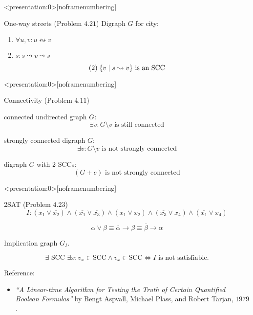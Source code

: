 \begin{frame}<presentation:0>[noframenumbering]
  \begin{exampleblock}{One-way streets (Problem $4.21$)}
	Digraph $G$ for city:
    \begin{enumerate}
      \item $\forall u,v: u \leftrightsquigarrow v$
      \item $s: s \leadsto v \leadsto s$
    \end{enumerate}
  \end{exampleblock}

  \pause
  \[
	(2)\; \{v \mid s \leadsto v\} \text{ is an SCC}
  \]
\end{frame}
\begin{frame}<presentation:0>[noframenumbering]
  \begin{exampleblock}{Connectivity (Problem $4.11$)}
	\begin{description}[Example:]
	  \item[Prove:] connected undirected graph $G$: 
		\[
		  \exists v: G \setminus v \text{ is still connected}
		\]
	  \item[Example:] strongly connected digraph $G$:
		\[
		  \exists v: G \setminus v \text{ is not strongly connected}
		\]
	  \item[Example:] digraph $G$ with 2 SCCs:
		\[
		  (G + e) \text{ is not strongly connected}
		\]
	\end{description}
  \end{exampleblock}
\end{frame}
\begin{frame}<presentation:0>[noframenumbering]
  \begin{exampleblock}{2SAT (Problem $4.23$)}
    \[
      I: (x_1 \lor \overline{x_2}) \land (\overline{x_1} \lor \overline{x_3}) \land (x_1 \lor x_2) \land (\overline{x_3} \lor x_4) \land (\overline{x_1} \lor x_4)
    \]
  \end{exampleblock}

  \pause
  \[
    \alpha \lor \beta \equiv \overline{\alpha} \to \beta \equiv \overline{\beta} \to \alpha
  \]

  \pause
  \begin{center}
    Implication graph $G_I$.
  \end{center}

  \pause
  \begin{theorem}[2SAT]
    \[
      \exists \text{ SCC } \exists x: v_x \in \text{SCC} \land v_{\overline{x}} \in \text{SCC} \iff I \text{ is not satisfiable}.
    \]
  \end{theorem}

  \pause
  \begin{alertblock}{Reference:}
    \begin{itemize}
      \item {\it ``A Linear-time Algorithm for Testing the Truth of Certain Quantified Boolean Formulas''} 
	by Bengt Aspvall, Michael Plass, and Robert Tarjan, $1979$.
    \end{itemize}
  \end{alertblock}
\end{frame}
